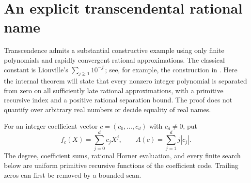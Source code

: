 \section{An explicit transcendental rational name}\label{sec:transcendence}

Transcendence admits a substantial constructive example using only finite
polynomials and rapidly convergent rational approximations. The classical
constant is Liouville's $\sum_{j\ge1}10^{-j!}$; see, for example, the
construction in \cite{miller-liouville}. Here the internal theorem will
state that every nonzero integer polynomial is separated from zero on
all sufficiently late rational approximations, with a primitive recursive
index and a positive rational separation bound. The proof does not
quantify over arbitrary real numbers or decide equality of real names.

For an integer coefficient vector $c=(c_0,\ldots,c_d)$ with $c_d\ne0$,
put
\[
 f_c(X)=\sum_{j=0}^d c_jX^j,
 \qquad A(c)=\sum_{j=1}^d j|c_j|.
\]
The degree, coefficient sums, rational Horner evaluation, and every
finite search below are uniform primitive recursive functions of the
coefficient code. Trailing zeros can first be removed by a bounded scan.

